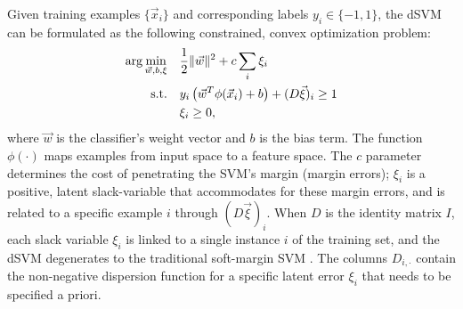 \begin{sloppypar}
Given training examples $\{\vec{x}_i\}$ and corresponding labels $y_i \in
\{-1, 1\}$, the \ac{dSVM} can be formulated as the following constrained,
convex optimization problem:
\begin{align}
  \arg\min_{\vec{w},b,\xi} \quad
  & \frac{1}{2}\lVert\vec{w}\rVert^2 
  + c \sum_i \xi_i
\\
  \text{s.t.} \quad 
  & y_i \left(\vec{w}^T \phi(\vec{x}_i) + b\right) + (D \vec{\xi})_i \ge 1
\\
  & \xi_i \ge 0,
\end{align}
%
where $\vec{w}$ is the classifier's weight vector and $b$ is the bias term.
The function $\phi(\cdot)$ maps examples from input space to a feature space.
The $c$ parameter determines the cost of penetrating the \ac{SVM}'s
margin (margin errors); $\xi_i$ is a positive, latent slack-variable that
accommodates for these margin errors, and is related to a specific example $i$
through $(D\vec{\xi})_i$. 
%
When $D$ is the identity matrix $I$, each slack variable $\xi_i$ is
linked to a single instance $i$ of the training set, and the \ac{dSVM}
degenerates to the traditional soft-margin \ac{SVM} \cite{cortes1995svn}. The
columns $D_{i,\cdot}$ contain the non-negative dispersion function for a
specific latent error $\xi_i$ that needs to be specified a priori.
\end{sloppypar}

